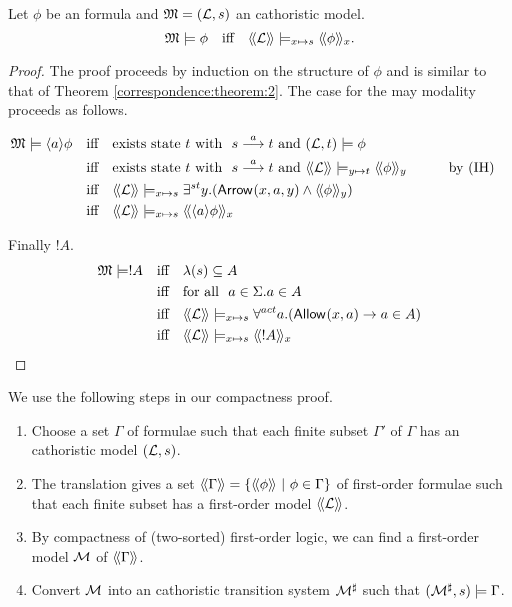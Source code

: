 \begin{theorem}\label{correspondence:theorem:2}
Let $\phi$ be an \cathoristic{} formula and $\frak{M} = (\mathcal{L}, s)$ an cathoristic
model.
\[
   \frak{M} \models \phi \quad  \text{iff} \quad \langle\!\langle \mathcal{L} \rangle\!\rangle \models_{x \mapsto s} \langle\!\langle \phi \rangle\!\rangle_x.
\]
\end{theorem}
\begin{proof}
The proof proceeds by induction on the structure of $\phi$ and is
similar to that of Theorem \ref{correspondence:theorem:2}.
The case for the may modality proceeds as follows.  

\begin{alignat*}{2}
  \MMM \models \MAY{a}\phi
     &\quad\text{iff}\quad 
  \text{exists state $t$ with }\ s \TRANS{a} t\ \text{and}\ (\LLL, t) \models \phi \\
     &\quad\text{iff}\quad
  \text{exists state $t$ with }\ s \TRANS{a} t\ \text{and}\ \SEMBTWO{\LLL} \models_{y \mapsto t} \SEMBTWO{\phi}_y &\qquad& \text{by (IH)}\\
     &\quad\text{iff}\quad
  \SEMBTWO{\LLL} \models_{x \mapsto s} \exists^{st} y.(\ARROWTWO{}{x}{a}{y} \AND \SEMBTWO{\phi}_y) \\
     &\quad\text{iff}\quad
   \SEMBTWO{\LLL} \models_{x \mapsto s} \SEMBTWO{\MAY{a}{\phi}}_x
\end{alignat*}

Finally $!A$.
\begin{alignat*}{2}
  \frak{M} \models !A
     &\quad\text{iff}\quad
  \lambda (s) \subseteq A \\
      &\quad\text{iff}\quad
  \text{for all }\ a \in \Sigma. a \in A \\
     &\quad\text{iff}\quad
  \langle\!\langle \mathcal{L} \rangle\!\rangle \models_{x \mapsto s} \forall^{act} a. (\mathsf{Allow}^{}(x, a) \rightarrow a \in A) \\
     &\quad\text{iff}\quad
  \langle\!\langle \mathcal{L} \rangle\!\rangle \models_{x \mapsto s} \langle\!\langle !A \rangle\!\rangle_x
\end{alignat*}
\end{proof}

\NI We use the following steps in our compactness proof.

\begin{enumerate}

\item Choose a set $\Gamma$ of \cathoristic{} formulae such that each finite
  subset $\Gamma'$ of $\Gamma$ has an cathoristic model $(\mathcal{L}, s)$.

\item The translation gives a set $\langle\!\langle \Gamma \rangle\!\rangle =
  \{\langle\!\langle \phi \rangle\!\rangle\ |\ \phi \in \Gamma\}$ of first-order formulae such that
  each finite subset has a first-order model $\langle\!\langle \mathcal{L} \rangle\!\rangle$.

\item By compactness of (two-sorted) first-order logic, we can find a
  first-order model $\mathcal{M}$ of $\langle\!\langle \Gamma \rangle\!\rangle$.

\item\label{compactness:step:4} Convert $\mathcal{M}$ into an cathoristic transition system
  $\mathcal{M}^{\sharp}$ such that $(\mathcal{M}^{\sharp}, s) \models \Gamma$.

\end{enumerate}

